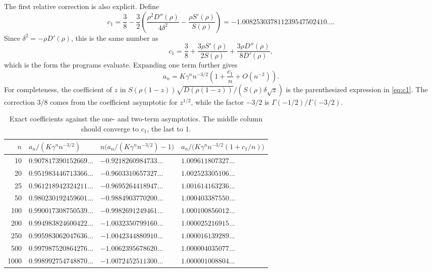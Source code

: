 \documentclass[11pt,letterpaper]{article}
\numberwithin{equation}{section}
\theoremstyle{definition}
\begin{document}
The first relative correction is also explicit. Define
\begin{equation}
 c_1=\frac38-\frac32\left(
     \frac{\rho^2D''(\rho)}{4\delta^2}
       -\frac{\rho S'(\rho)}{S(\rho)}\right)
    =-1.008253037811239547502410\ldots.
 \label{eq:c1}
\end{equation}
Since $\delta^2=-\rho D'(\rho)$, this is the same number as
\begin{equation}
 c_1=\frac38+\frac{3\rho S'(\rho)}{2S(\rho)}
          +\frac{3\rho D''(\rho)}{8D'(\rho)},
 \label{eq:c1alt}
\end{equation}
which is the form the programs evaluate.
Expanding one term further gives
\begin{equation}
 a_n=K\gamma^n n^{-3/2}
       \left(1+\frac{c_1}{n}+O(n^{-2})\right).
 \label{eq:asymp2}
\end{equation}
For completeness, the coefficient of $z$ in
$S(\rho(1-z))\sqrt{D(\rho(1-z))}/(S(\rho)\delta\sqrt z)$
is the parenthesized expression in \eqref{eq:c1}. The correction $3/8$
comes from the coefficient asymptotic for $z^{1/2}$, while the factor
$-3/2$ is $\Gamma(-1/2)/\Gamma(-3/2)$.

\begin{table}[ht]
\centering
\caption{Exact coefficients against the one- and two-term asymptotics.
The middle column should converge to $c_1$, the last to $1$.}
\begin{tabular}{r l l l}
\toprule
$n$ & $a_n/(K\gamma^n n^{-3/2})$
    & $n\bigl(a_n/(K\gamma^n n^{-3/2})-1\bigr)$
    & $a_n/\bigl(K\gamma^nn^{-3/2}(1+c_1/n)\bigr)$\\
\midrule
10 & $0.907817390152669\ldots$ & $-0.9218260984733\ldots$ & $1.009611807327\ldots$\\
20 & $0.951983446713366\ldots$ & $-0.9603310657327\ldots$ & $1.002523305106\ldots$\\
25 & $0.961218942324211\ldots$ & $-0.9695264418947\ldots$ & $1.001614163236\ldots$\\
50 & $0.980230192459601\ldots$ & $-0.9884903770200\ldots$ & $1.000403387550\ldots$\\
100 & $0.990017308750539\ldots$ & $-0.9982691249461\ldots$ & $1.000100856012\ldots$\\
200 & $0.994983824600422\ldots$ & $-1.0032350799160\ldots$ & $1.000025216915\ldots$\\
250 & $0.995983062047636\ldots$ & $-1.0042344880910\ldots$ & $1.000016139289\ldots$\\
500 & $0.997987520864276\ldots$ & $-1.0062395678620\ldots$ & $1.000004035077\ldots$\\
1000 & $0.998992754748870\ldots$ & $-1.0072452511300\ldots$ & $1.000001008804\ldots$\\
\bottomrule
\end{tabular}
\label{tab:ratios}
\end{table}
\end{document}
